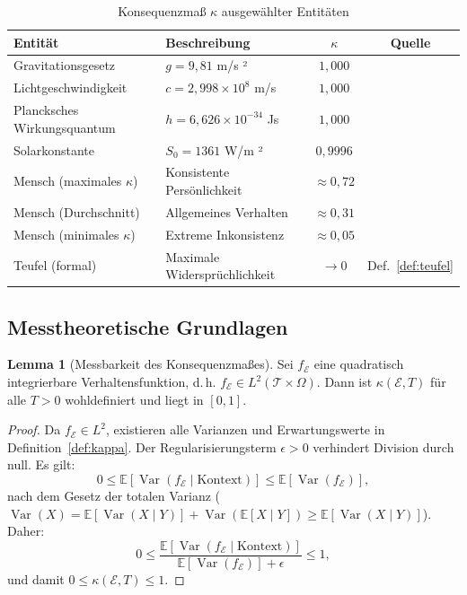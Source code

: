 ﻿\documentclass[a4paper,12pt]{article}
\DeclareMathOperator{\Var}{Var}
\theoremstyle{definition}
\newtheorem{lemma}{Lemma}
\begin{document}
\begin{table}[H]
\centering
\caption{Konsequenzmaß $\kappa$ ausgewählter Entitäten}
\label{tab:kappa}
\begin{tabular}{llcc}
\toprule
\textbf{Entität} & \textbf{Beschreibung} & $\kappa$ & \textbf{Quelle} \\
\midrule
Gravitationsgesetz & $g = 9{,}81$ m/s ² & $1{,}000$ & \cite{mohr2018} \\
Lichtgeschwindigkeit & $c = 2{,}998 \times 10^8$ m/s & $1{,}000$ & \cite{mohr2018} \\
Plancksches Wirkungsquantum & $h = 6{,}626 \times 10^{-34}$ Js & $1{,}000$ & \cite{mohr2018} \\
Solarkonstante & $S_0 = 1361$ W/m ² & $0{,}9996$ & \cite{kopp2011} \\
Mensch (maximales $\kappa$) & Konsistente Persönlichkeit & $\approx 0{,}72$ & \cite{kahneman2011} \\
Mensch (Durchschnitt) & Allgemeines Verhalten & $\approx 0{,}31$ & \cite{ariely2008} \\
Mensch (minimales $\kappa$) & Extreme Inkonsistenz & $\approx 0{,}05$ & \cite{ariely2008} \\
Teufel (formal) & Maximale Widersprüchlichkeit & $\to 0$ & Def.~\ref{def:teufel} \\
\bottomrule
\end{tabular}
\end{table}

\subsection{Messtheoretische Grundlagen}

\begin{lemma}[Messbarkeit des Konsequenzmaßes]
\label{lem:messbar}
Sei $f_{\mathcal{E}}$ eine quadratisch integrierbare Verhaltensfunktion, d.\,h. $f_{\mathcal{E}} \in L^2(\mathcal{T} \times \Omega)$. Dann ist $\kappa(\mathcal{E}, T)$ für alle $T > 0$ wohldefiniert und liegt in $[0,1]$.
\end{lemma}

\begin{proof}
Da $f_{\mathcal{E}} \in L^2$, existieren alle Varianzen und Erwartungswerte in Definition~\ref{def:kappa}. Der Regularisierungsterm $\epsilon > 0$ verhindert Division durch null. Es gilt:
\[
0 \leq \mathbb{E}[\Var(f_{\mathcal{E}} \mid \text{Kontext})] \leq \mathbb{E}[\Var(f_{\mathcal{E}})],
\]
nach dem Gesetz der totalen Varianz ($\Var(X) = \mathbb{E}[\Var(X \mid Y)] + \Var(\mathbb{E}[X \mid Y]) \geq \mathbb{E}[\Var(X \mid Y)]$). Daher:
\[
0 \leq \frac{\mathbb{E}[\Var(f_{\mathcal{E}} \mid \text{Kontext})]}{\mathbb{E}[\Var(f_{\mathcal{E}})] + \epsilon} \leq 1,
\]
und damit $0 \leq \kappa(\mathcal{E}, T) \leq 1$. \qedhere
\end{proof}
\end{document}
